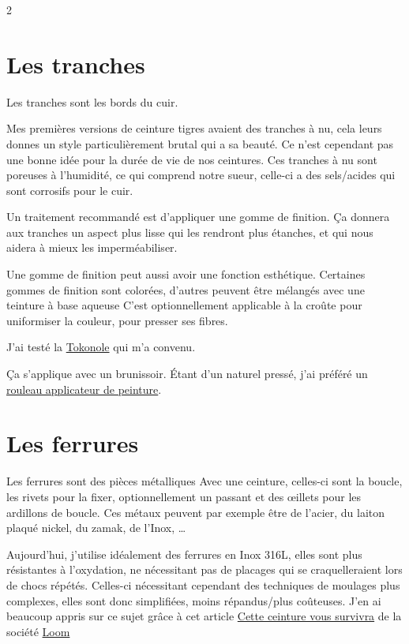 \documentclass[a4paper,11pt]{article}
\begin{document}
\begin{blogmain}
\begin{multicols}{2}

\section{Les tranches}
Les tranches sont les bords du cuir.

Mes premières versions de ceinture tigres avaient des tranches à nu, cela leurs donnes un style particulièrement brutal qui a sa beauté.
Ce n'est cependant pas une bonne idée pour la durée de vie de nos ceintures.
Ces tranches à nu sont poreuses à l'humidité, ce qui comprend notre sueur, celle-ci a des sels/acides qui sont corrosifs pour le cuir.

Un traitement recommandé est d'appliquer une gomme de finition.
Ça donnera aux tranches un aspect plus lisse qui les rendront plus étanches, et qui nous aidera à mieux les imperméabiliser.

Une gomme de finition peut aussi avoir une fonction esthétique.
Certaines gommes de finition sont colorées, d'autres peuvent être mélangés avec une teinture à base aqueuse
C'est optionnellement applicable à la croûte pour uniformiser la couleur, pour presser ses fibres.

J'ai testé la \href{https://www.decocuir.com/blogs/blog-tutoriel-patron-cuir/tokonole-gomme-cuir-brunir-tranche}{Tokonole} qui m'a convenu.

Ça s'applique avec un brunissoir.
Étant d'un naturel pressé, j'ai préféré un \href{https://www.decocuir.com/products/rouleau-depose-teinture-tranche-cuir-ceinture-anse-bords}{rouleau applicateur de peinture}.

\section{Les ferrures}
Les ferrures sont des pièces métalliques
Avec une ceinture, celles-ci sont la boucle, les rivets pour la fixer, optionnellement un passant et des œillets pour les ardillons de boucle.
Ces métaux peuvent par exemple être de l'acier, du laiton plaqué nickel, du zamak, de l'Inox, \dots

Aujourd'hui, j'utilise idéalement des ferrures en Inox 316L, elles sont plus résistantes à l'oxydation, ne nécessitant pas de placages qui se craquelleraient lors de chocs répétés.
Celles-ci nécessitant cependant des techniques de moulages plus complexes, elles sont donc simplifiées, moins répandus/plus coûteuses.
J'en ai beaucoup appris sur ce sujet grâce à cet article \href{https://la-mode-a-l-envers.loom.fr/blog/cette-ceinture-vous-survivra}{Cette ceinture vous survivra} de la société \href{https://www.loom.fr/}{Loom}


\end{multicols}
\end{blogmain}
\end{document}
